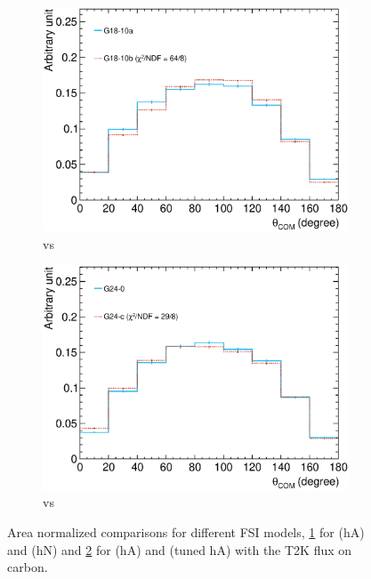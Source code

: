      \begin{figure}
     \begin{subfigure}[b]{\dbfigwid\textwidth}
          \centering
          \includegraphics[width=\textwidth]{figures/COM/anorm-10a10b-lfgdef_da_tan.eps}
          \caption{\geta vs \getb }
          \label{subfig:10a10b-comp-t2k}
     \end{subfigure}
     \begin{subfigure}[b]{\dbfigwid\textwidth}
          \centering
          \includegraphics[width=\textwidth]{figures/COM/anorm-g240c-t2k-_da_tan.eps}
          \caption{\gZero vs \gC}
          \label{subfig:g240c-comp-t2k}
     \end{subfigure}
     \caption{Area normalized comparisons for different FSI models, \ref{subfig:10a10b-comp-t2k} for \geta (hA) and \getb (hN) and \ref{subfig:g240c-comp-t2k} for \gZero (hA) and \gC (tuned hA) with the T2K flux on carbon.}
     \label{fig:fsi-comp}
     \end{figure}

